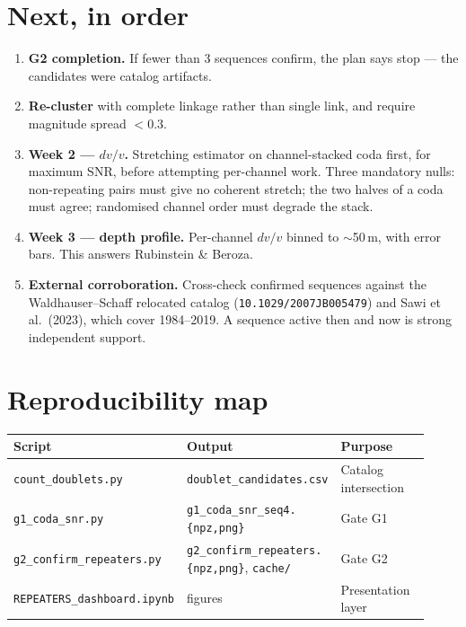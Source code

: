 \documentclass[11pt]{article}
\begin{document}
\section{Next, in order}

\begin{enumerate}[leftmargin=*]
  \item \textbf{G2 completion.} If fewer than 3 sequences confirm, the plan says
  stop --- the candidates were catalog artifacts.
  \item \textbf{Re-cluster} with complete linkage rather than single link, and
  require magnitude spread $<0.3$.
  \item \textbf{Week 2 --- $dv/v$.} Stretching estimator on channel-stacked coda
  first, for maximum SNR, before attempting per-channel work. Three mandatory
  nulls: non-repeating pairs must give no coherent stretch; the two halves of a
  coda must agree; randomised channel order must degrade the stack.
  \item \textbf{Week 3 --- depth profile.} Per-channel $dv/v$ binned to
  $\sim$50\,m, with error bars. This answers Rubinstein \& Beroza.
  \item \textbf{External corroboration.} Cross-check confirmed sequences against
  the Waldhauser--Schaff relocated catalog (\texttt{10.1029/2007JB005479}) and
  Sawi et al.\ (2023), which cover 1984--2019. A sequence active then and now is
  strong independent support.
\end{enumerate}

\section{Reproducibility map}

\begin{table}[H]
\centering
\small
\begin{tabular}{p{0.30\linewidth}p{0.28\linewidth}p{0.34\linewidth}}
\toprule
Script & Output & Purpose \\
\midrule
\texttt{count\_doublets.py} & \texttt{doublet\_candidates.csv} & Catalog intersection \\
\texttt{g1\_coda\_snr.py} & \texttt{g1\_coda\_snr\_seq4.\{npz,png\}} & Gate G1 \\
\texttt{g2\_confirm\_repeaters.py} & \texttt{g2\_confirm\_repeaters.\{npz,png\}}, \texttt{cache/} & Gate G2 \\
\texttt{REPEATERS\_dashboard.ipynb} & figures & Presentation layer \\
\bottomrule
\end{tabular}
\end{table}
\end{document}
